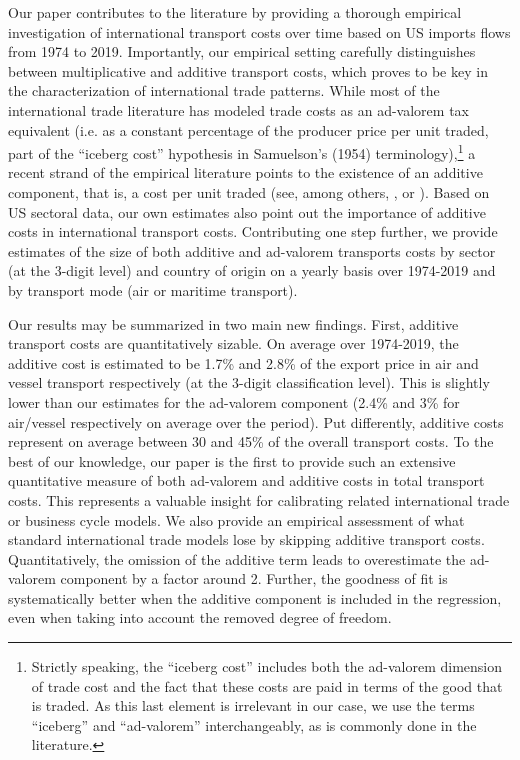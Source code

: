 \documentclass[a4paper,11pt]{article}
\begin{document}
Our paper contributes to the literature by providing a thorough empirical investigation of international transport costs over time based on US imports flows from 1974 to 2019. Importantly, our empirical setting carefully distinguishes between multiplicative and additive transport costs, which proves to be key in the characterization of international trade patterns. While most of the international trade literature has modeled trade costs as an ad-valorem tax equivalent (i.e. as a constant percentage of the producer price per unit traded, part of the ``iceberg cost'' hypothesis in Samuelson's (1954) terminology\cite{samuelson1954}),\footnote{Strictly speaking, the ``iceberg cost'' includes both the ad-valorem dimension of trade cost and the fact that these costs are paid in terms of the good that is traded.
As this last element is irrelevant in our case, we use the terms ``iceberg'' and ``ad-valorem'' interchangeably, as is commonly done in the literature.} a recent strand of the empirical literature points to the existence of an additive component, that is, a cost per unit traded (see, among others, \cite{Irrazabal_2015}, or \cite{martin2012}). Based on US sectoral data, our own estimates also point out the importance of additive costs in international transport costs. Contributing one step further, we provide estimates of the size of both additive and ad-valorem transports costs by sector (at the 3-digit level) and country of origin on a yearly basis over 1974-2019 and by transport mode (air or maritime transport).\smallskip


Our results may be summarized in two main new findings.
First, additive transport costs are quantitatively sizable.
On average over 1974-2019, the additive cost is estimated to be 1.7\% and 2.8\% of the export price in air and vessel transport respectively (at the 3-digit classification level). This is slightly lower than our estimates for the ad-valorem component (2.4\% and 3\% for air/vessel respectively on average over the period).
Put differently, additive costs represent on average between 30 and 45\% of the overall transport costs. To the best of our knowledge, our paper is the first to provide such an extensive quantitative measure of both ad-valorem and additive costs in total transport costs.
This represents a valuable insight for calibrating related international trade or business cycle models.
We also provide an empirical assessment of what standard international trade models lose by skipping additive transport costs.
Quantitatively, the omission of the additive term leads to overestimate the ad-valorem component by a factor around 2. Further, the goodness of fit is systematically better when the additive component is included in the regression, even when taking into account the removed degree of freedom.\smallskip
\end{document}
